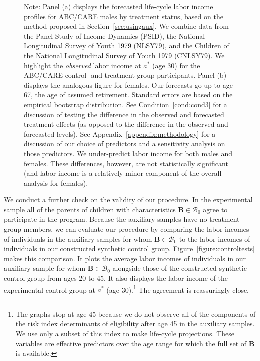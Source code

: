 \begin{figure}
Note: Panel (a) displays the forecasted life-cycle labor income profiles for ABC/CARE males by treatment status, based on the method proposed in Section~\ref{sec:usingaux}. We combine data from the Panel Study of Income Dynamics (PSID), the National Longitudinal Survey of Youth 1979 (NLSY79), and the Children of the National Longitudinal Survey of Youth 1979 (CNLSY79). We highlight the \textit{observed} labor income at $a^*$ (age 30) for the ABC/CARE control- and treatment-group participants. Panel (b) displays the analogous figure for females. Our forecasts go up to age 67, the age of assumed retirement. Standard errors are based on the empirical bootstrap distribution. See Condition~\ref{cond:cond3} for a discussion of testing the difference in the observed and forecasted treatment effects (as opposed to the difference in the observed and forecasted levels). See  Appendix~\ref{appendix:methodology} for a discussion of our choice of predictors and a sensitivity analysis on those predictors. We under-predict labor income for both males and females. These differences, however, are not statistically significant (and labor income is a relatively minor component of the overall analysis for females).
\end{figure}

We conduct a further check on the validity of our procedure. In the experimental sample all of the parents of children with characteristics $\bm{B} \in \mathcal{B}_0$ agree to participate in the program.  Because the auxiliary samples have no treatment group members, we can evaluate our procedure by comparing the labor incomes of individuals in the auxiliary samples for whom $\bm{B} \in \mathcal{B}_0$ to the labor incomes of individuals in our constructed synthetic control group. Figure~\ref{figure:controltests} makes this comparison. It plots the average labor incomes of individuals in our auxiliary sample for whom $\bm{B} \in \mathcal{B}_0$ alongside those of the constructed synthetic control group from ages 20 to 45. It also displays the labor income of the experimental control group at $a^*$ (age 30).\footnote{The graphs stop at age 45 because we do not observe all of the components of the risk index determinants of eligibility after age 45 in the auxiliary samples. We use only a subset of this index to make life-cycle projections. These variables are effective predictors over the age range for which the full set of $\bm{B}$ is available.} The agreement is reassuringly close.

